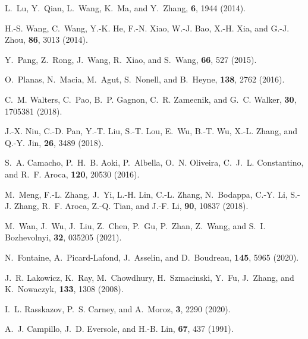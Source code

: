 \documentclass[9pt,twocolumn,twoside]{osajnl}
\begin{document}
\begin{thebibliography}{10}
L.~Lu, Y.~Qian, L.~Wang, K.~Ma, and Y.~Zhang, {\protect{}} \textbf{6}, 1944 (2014).

H.-S. Wang, C.~Wang, Y.-K. He, F.-N. Xiao, W.-J. Bao, X.-H. Xia, and G.-J.
  Zhou, {\protect{}} \textbf{86}, 3013 (2014).

Y.~Pang, Z.~Rong, J.~Wang, R.~Xiao, and S.~Wang,
  {\protect{}} \textbf{66}, 527
  (2015).

O.~Planas, N.~Macia, M.~Agut, S.~Nonell, and B.~Heyne,
  {\protect{}}
  \textbf{138}, 2762 (2016).

C.~M. Walters, C.~Pao, B.~P. Gagnon, C.~R. Zamecnik, and G.~C. Walker,
  {\protect{}} \textbf{30}, 1705381 (2018).

J.-X. Niu, C.-D. Pan, Y.-T. Liu, S.-T. Lou, E.~Wu, B.-T. Wu, X.-L. Zhang, and
  Q.-Y. Jin, {\protect{}} \textbf{26}, 3489 (2018).

S.~A. Camacho, P.~H.~B. Aoki, P.~Albella, O.~N. Oliveira, C.~J.~L. Constantino,
  and R.~F. Aroca, {\protect{}}
  \textbf{120}, 20530 (2016).

M.~Meng, F.-L. Zhang, J.~Yi, L.-H. Lin, C.-L. Zhang, N.~Bodappa, C.-Y. Li,
  S.-J. Zhang, R.~F. Aroca, Z.-Q. Tian, and J.-F. Li,
  {\protect{}} \textbf{90}, 10837 (2018).

M.~Wan, J.~Wu, J.~Liu, Z.~Chen, P.~Gu, P.~Zhan, Z.~Wang, and S.~I. Bozhevolnyi,
  {\protect{}} \textbf{32}, 035205 (2021).

N.~Fontaine, A.~Picard-Lafond, J.~Asselin, and D.~Boudreau,
  {\protect{}} \textbf{145}, 5965 (2020).

J.~R. Lakowicz, K.~Ray, M.~Chowdhury, H.~Szmacinski, Y.~Fu, J.~Zhang, and
  K.~Nowaczyk, {\protect{}} \textbf{133}, 1308 (2008).

I.~L. Rasskazov, P.~S. Carney, and A.~Moroz, {\protect{}} \textbf{3}, 2290 (2020).

A.~J. Campillo, J.~D. Eversole, and H.-B. Lin, {\protect{}} \textbf{67}, 437 (1991).


\end{thebibliography}
\end{document}
